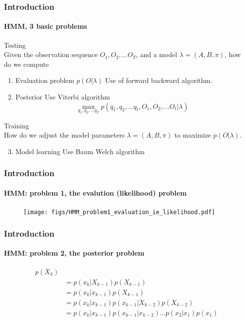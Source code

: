 \begin{frame}
\frametitle{Introduction}
\framesubtitle{HMM, 3 basic problems}
\logoCSIPCPL\mypagenum
	{\color{red}Testing}\\
	Given the observation sequence $O_1, O_2, ... O_T$, and a model $\lambda=(A, B, \pi)$, how do we compute	
	\vspace{0.1in}
	\begin{enumerate}	
		\item {\color{blue} Evaluation problem} $p(O|\lambda)$ Use of forward backward algorithm.
		\item  {\color{blue} Posterior} Use Viterbi algorithm
		\begin{equation*} 
			\max_{q_1, q_2, ... q_T}p(q_1, q_2, ... q_t, O_1, O_2, ... O_t|\lambda)
		\end{equation*}
	\end{enumerate}
	\vspace{0.3in}
	{\color{red}Training}\\
	How do we adjust the model parameters $\lambda=(A, B, \pi)$ to maximize $p(O|\lambda)$.
	\vspace{0.1in}
	\begin{enumerate}\setcounter{enumi}{2}
		\item  {\color{blue} Model learning} Use Baum Welch algorithm
	\end{enumerate}
\end{frame}



\begin{frame}
\frametitle{Introduction}
\framesubtitle{HMM: problem 1, the evalution (likelihood) problem}
\mypagenum
	\begin{figure}
		\texttt{[image: figs/HMM\_problem1\_evaluation\_ie\_likelihood.pdf]}
	\end{figure}
\end{frame}


\begin{frame}
\frametitle{Introduction}
\framesubtitle{HMM: problem 2, the posterior problem}
\logoCSIPCPL\mypagenum
	\begin{align*}
		p(X_k) & \\
		&= p(x_k| X_{k-1})p(X_{k-1})   	  							\\
		&= p(x_k| x_{k-1}) p(X_{k-1})   								\\  
		&= p(x_k| x_{k-1}) p(x_{k-1}| X_{k-2})p(X_{k-2})  				\\	
		&= p(x_k| x_{k-1}) p(x_{k-1}| x_{k-2}) ... p(x_2|x_1)p(x_1)  		
	\end{align*}
\end{frame}




